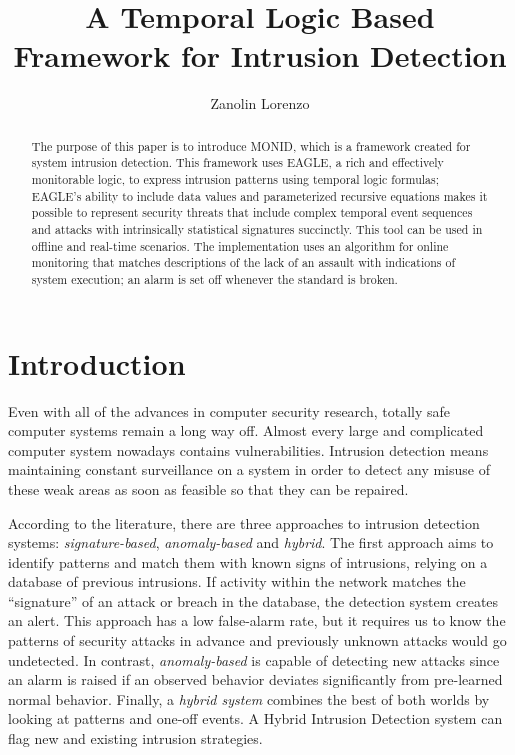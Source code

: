 \documentclass[english]{article}
\title{A Temporal Logic Based Framework for Intrusion Detection}
\author{Zanolin Lorenzo}
\begin{document}
\maketitle

\begin{abstract}
The purpose of this paper is to introduce MONID, which is a framework created for system intrusion detection. This framework uses EAGLE, a rich and effectively monitorable logic, to express intrusion patterns using temporal logic formulas; EAGLE's ability to include data values and parameterized recursive equations makes it possible to represent security threats that include complex temporal event sequences and attacks with intrinsically statistical signatures succinctly. This tool can be used in offline and real-time scenarios. The implementation uses an algorithm for online monitoring that matches descriptions of the lack of an assault with indications of system execution; an alarm is set off whenever the standard is broken.
\end{abstract}

\tableofcontents
\newpage

\section{Introduction}
Even with all of the advances in computer security research, totally safe computer systems remain a long way off. Almost every large and complicated computer system nowadays contains vulnerabilities. Intrusion detection means maintaining constant surveillance on a system in order to detect any misuse of these weak areas as soon as feasible so that they can be repaired.

According to the literature, there are three approaches to intrusion detection systems: \textit{signature-based}\cite{gao2014cyber}, \textit{anomaly-based}\cite{jyothsna2011review} and \textit{hybrid}\cite{garg2016hybrid}. The first approach aims to identify patterns and match them with known signs of intrusions, relying on a database of previous intrusions. If activity within the network matches the “signature” of an attack or breach in the database, the detection system creates an alert. This approach has a low false-alarm rate, but it requires us to know the patterns of security attacks in advance and previously unknown attacks would go undetected. In contrast, \textit{anomaly-based} is capable of detecting new attacks since an alarm is raised if an observed behavior deviates significantly from pre-learned normal behavior. Finally, a \textit{hybrid system} combines the best of both worlds by looking at patterns and one-off events. A Hybrid Intrusion Detection system can flag new and existing intrusion strategies. 
\end{document}
